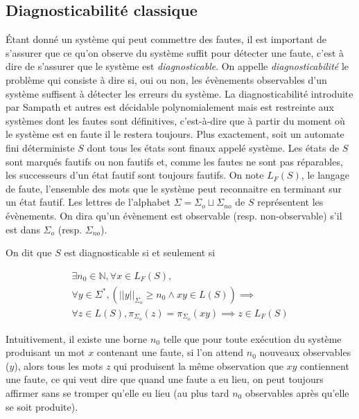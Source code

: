 \documentclass[conference]{IEEEtran}
\begin{document}
\subsection{Diagnosticabilité classique}
\'Etant donné un système qui peut commettre des fautes, il est important de s'assurer que ce qu'on observe du système suffit pour détecter une faute, c'est à dire de s'assurer que le système est \emph{diagnosticable}. On appelle \emph{diagnosticabilité} le problème qui consiste à dire si, oui ou non, les évènements observables d'un système suffisent à détecter les erreurs du système. La diagnosticabilité introduite par Sampath et autres\cite{SamSRST96} est décidable polynomialement mais est restreinte aux systèmes dont les fautes sont définitives, c'est-à-dire que à partir du moment où le système est en faute il le restera toujours.
\newline
Plus exactement, soit un automate fini d\'eterministe $S$ dont tous les états sont finaux appel\'e syst\`eme. Les états de $S$ sont marqués fautifs ou non fautifs et, comme les fautes ne sont pas réparables, les successeurs d'un état fautif sont toujours fautifs. On note  $L_F(S)$, le langage de faute, l'ensemble des mots que le système peut reconnaitre en terminant sur un état fautif. Les lettres de l'alphabet $\Sigma=\Sigma_o\sqcup \Sigma_{no}$ de $S$ représentent les évènements. On dira qu'un \'ev\`enement est observable (resp. non-observable) s'il est dans $\Sigma_o$ (resp. $\Sigma_{no}$).

On dit que $S$ est diagnosticable si et seulement si

$$\begin{array}{l}
\exists n_0 \in \mathbb N, \forall x \in L_F(S),\\
\forall y \in \Sigma^*, \left(||y||_{\Sigma_o} \ge n_0 \land xy \in  L(S)\right) \implies\\
\forall z \in L(S), \pi_{\Sigma_o}(z)=\pi_{\Sigma_o}(xy) \implies z \in L_F(S)
\end{array}$$

Intuitivement, il existe une borne $n_0$ telle que pour toute ex\'ecution du système produisant un mot $x$ contenant une faute, si l'on attend $n_0$ nouveaux observables ($y$), alors tous les mots $z$ qui produisent la m\^eme observation que $xy$ contiennent une faute, ce qui veut dire que quand une faute a eu lieu, on peut toujours affirmer sans se tromper qu'elle eu lieu (au plus tard $n_0$ observables après qu'elle se soit produite).

\end{document}
